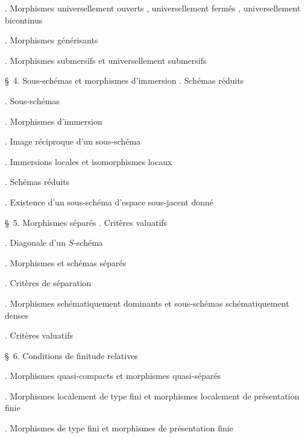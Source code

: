 
\noindent{}. Morphismes universellement ouverts , universellement fermés , universellement bicontinus\dotfill

\noindent{}. Morphismes générisants\dotfill

\noindent{}. Morphismes submersifs et universellement submersifs

\noindent\quad \S\ 4. Sous-schémas et morphismes d'immersion . Schémas réduits\dotfill

\noindent{}. Sous-schémas\dotfill

\noindent{}. Morphismes d'immersion\dotfill

\noindent{}. Image réciproque d'un sous-schéma\dotfill

\noindent{}. Immersions locales et isomorphismes locaux\dotfill

\noindent{}. Schémas réduits\dotfill

\noindent{}. Existence d'un sous-schéma d'espace sous-jacent donné\dotfill

\noindent\quad \S\ 5. Morphismes séparés . Critères valuatifs\dotfill

\noindent{}. Diagonale d'un $S$-schéma\dotfill

\noindent{}. Morphismes et schémas séparés\dotfill

\noindent{}. Critères de séparation\dotfill

\noindent{}. Morphismes schématiquement dominants et sous-schémas schématiquement denses\dotfill

\noindent{}. Critères valuatifs\dotfill

\noindent\quad \S\ 6. Conditions de finitude relatives\dotfill

\noindent{}. Morphismes quasi-compacts et morphismes quasi-séparés\dotfill

\noindent{}. Morphismes localement de type fini et morphismes localement de présentation finie\dotfill

\noindent{}. Morphismes de type fini et morphismes de présentation finie\dotfill{}

